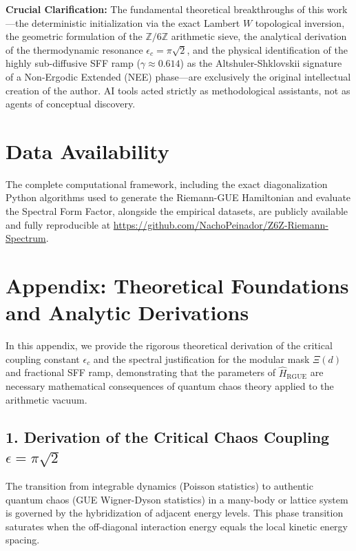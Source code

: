 \documentclass[aps,prl,preprint,superscriptaddress,floatfix]{revtex4-2}
\begin{document}
\begin{acknowledgments}
\textbf{Crucial Clarification:} The fundamental theoretical breakthroughs of this work—the deterministic initialization via the exact Lambert $W$ topological inversion, the geometric formulation of the $\mathbb{Z}/6\mathbb{Z}$ arithmetic sieve, the analytical derivation of the thermodynamic resonance $\epsilon_c = \pi\sqrt{2}$, and the physical identification of the highly sub-diffusive SFF ramp ($\gamma \approx 0.614$) as the Altshuler-Shklovskii signature of a Non-Ergodic Extended (NEE) phase—are exclusively the original intellectual creation of the author. AI tools acted strictly as methodological assistants, not as agents of conceptual discovery.
\end{acknowledgments}

\section{Data Availability}
The complete computational framework, including the exact diagonalization Python algorithms used to generate the Riemann-GUE Hamiltonian and evaluate the Spectral Form Factor, alongside the empirical datasets, are publicly available and fully reproducible at \url{https://github.com/NachoPeinador/Z6Z-Riemann-Spectrum}.

\appendix

\section{Appendix: Theoretical Foundations and Analytic Derivations}
\label{app:theory}

In this appendix, we provide the rigorous theoretical derivation of the critical coupling constant $\epsilon_c$ and the spectral justification for the modular mask $\Xi(d)$ and fractional SFF ramp, demonstrating that the parameters of $\hat{H}_{\text{RGUE}}$ are necessary mathematical consequences of quantum chaos theory applied to the arithmetic vacuum.

\subsection{1. Derivation of the Critical Chaos Coupling \texorpdfstring{$\epsilon = \pi\sqrt{2}$}{epsilon}}
The transition from integrable dynamics (Poisson statistics) to authentic quantum chaos (GUE Wigner-Dyson statistics) in a many-body or lattice system is governed by the hybridization of adjacent energy levels. This phase transition saturates when the off-diagonal interaction energy equals the local kinetic energy spacing.
\end{document}
